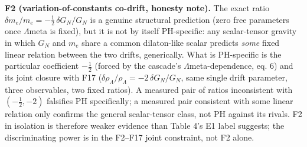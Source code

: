\documentclass[11pt,letterpaper]{article}
\begin{document}
\noindent \textbf{F2 (variation-of-constants co-drift, honesty note). }The exact ratio $\delta m_e/m_e = -\tfrac{1}{2}\,\delta G_N/G_N$ is a genuine structural prediction (zero free parameters once $\Lambda$meta is fixed), but it is not by itself PH-specific: any scalar-tensor gravity in which $G_N$ and $m_e$ share a common dilaton-like scalar predicts \emph{some} fixed linear relation between the two drifts, generically. What is PH-specific is the particular coefficient $-\tfrac{1}{2}$ (forced by the cascade's $\Lambda$meta-dependence, eq. 6) and its joint closure with F17 ($\delta\rho_\Lambda/\rho_\Lambda=-2\,\delta G_N/G_N$, same single drift parameter, three observables, two fixed ratios). A measured pair of ratios inconsistent with $(-\tfrac{1}{2},-2)$ falsifies PH specifically; a measured pair consistent with some linear relation only confirms the general scalar-tensor class, not PH against its rivals. F2 in isolation is therefore weaker evidence than Table 4's E1 label suggests; the discriminating power is in the F2--F17 joint constraint, not F2 alone.
\end{document}
